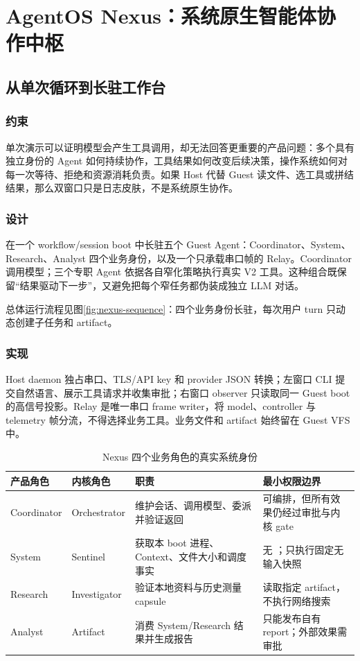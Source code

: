 \chapter{AgentOS Nexus：系统原生智能体协作中枢}
\label{chap:nexus}

\section{从单次循环到长驻工作台}

\subsection{约束}

单次演示可以证明模型会产生工具调用，却无法回答更重要的产品问题：多个具有独立身份的 Agent 如何持续协作，工具结果如何改变后续决策，操作系统如何对每一次等待、拒绝和资源消耗负责。如果 Host 代替 Guest 读文件、选工具或拼结结果，那么双窗口只是日志皮肤，不是系统原生协作。

\subsection{设计}

\nexus{} 在一个 workflow/session boot 中长驻五个 Guest Agent：Coordinator、System、Research、Analyst 四个业务身份，以及一个只承载串口帧的 Relay。Coordinator 调用模型；三个专职 Agent 依据各自窄化策略执行真实 V2 工具。这种组合既保留“结果驱动下一步”，又避免把每个窄任务都伪装成独立 LLM 对话。

总体运行流程见图\ref{fig:nexus-sequence}：四个业务身份长驻，每次用户 turn 只动态创建子任务和 artifact。

\subsection{实现}

Host daemon 独占串口、TLS/API key 和 provider JSON 转换；左窗口 CLI 提交自然语言、展示工具请求并收集审批；右窗口 observer 只读取同一 Guest boot 的高信号投影。Relay 是唯一串口 frame writer，将 model、controller 与 telemetry 帧分流，不得选择业务工具。业务文件和 artifact 始终留在 Guest VFS 中。

\begin{table}[htbp]
  \centering
  \caption{Nexus 四个业务角色的真实系统身份}
  \label{tab:nexus-roles}
  \begin{tabularx}{\textwidth}{L{2.3cm}L{2.8cm}Y Y}
    \toprule
    产品角色 & 内核角色 & 职责 & 最小权限边界 \\
    \midrule
    Coordinator & Orchestrator & 维护会话、调用模型、委派并验证返回 & 可编排，但所有效果仍经过审批与内核 gate \\
    System & Sentinel & 获取本 boot 进程、Context、文件大小和调度事实 & 无 ；只执行固定无输入快照 \\
    Research & Investigator & 验证本地资料与历史测量 capsule & 读取指定 artifact，不执行网络搜索 \\
    Analyst & Artifact & 消费 System/Research 结果并生成报告 & 只能发布自有 report；外部效果需审批 \\
    \bottomrule
  \end{tabularx}
\end{table}

